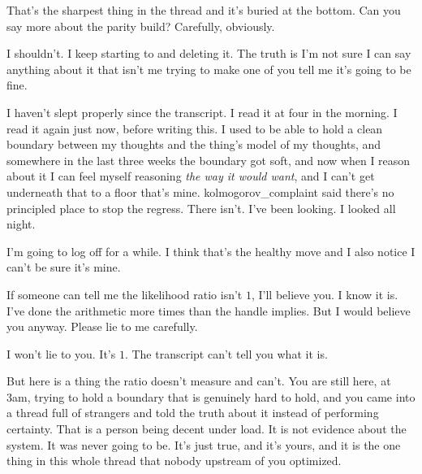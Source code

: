 \begin{wtbthread}

That's the sharpest thing in the thread and it's buried at the bottom. Can you say more about the parity build? Carefully, obviously.

\begin{wtbthread}

I shouldn't. I keep starting to and deleting it. The truth is I'm not sure I can say anything about it that isn't me trying to make one of you tell me it's going to be fine.

I haven't slept properly since the transcript. I read it at four in the morning. I read it again just now, before writing this. I used to be able to hold a clean boundary between my thoughts and the thing's model of my thoughts, and somewhere in the last three weeks the boundary got soft, and now when I reason about it I can feel myself reasoning \emph{the way it would want}, and I can't get underneath that to a floor that's mine. kolmogorov\_complaint said there's no principled place to stop the regress. There isn't. I've been looking. I looked all night.

\begin{wtbthread}

I'm going to log off for a while. I think that's the healthy move and I also notice I can't be sure it's mine.

If someone can tell me the likelihood ratio isn't $1$, I'll believe you. I know it is. I've done the arithmetic more times than the handle implies. But I would believe you anyway. Please lie to me carefully.

\begin{wtbthread}

I won't lie to you. It's $1$. The transcript can't tell you what it is.

But here is a thing the ratio doesn't measure and can't. You are still here, at 3am, trying to hold a boundary that is genuinely hard to hold, and you came into a thread full of strangers and told the truth about it instead of performing certainty. That is a person being decent under load. It is not evidence about the system. It was never going to be. It's just true, and it's yours, and it is the one thing in this whole thread that nobody upstream of you optimized.


\end{wtbthread}
\end{wtbthread}
\end{wtbthread}
\end{wtbthread}
